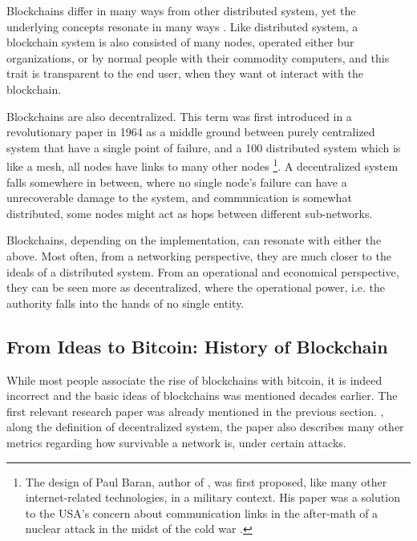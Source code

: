 Blockchains differ in many ways from other distributed system, yet the underlying concepts resonate
in many ways \cite{Herlihy_2019}. Like distributed system, a blockchain system is also consisted of
many nodes, operated either bur organizations, or by normal people with their commodity computers,
and this trait is transparent to the end user, when they want ot interact with the blockchain.

Blockchains are also decentralized. This term was first introduced in a revolutionary paper in 1964
as a middle ground between purely centralized system that have a single point of failure, and a 100%
distributed system which is like a mesh, all nodes have links to many other nodes
\cite{on_distributed_comm_networks_1964} \footnote{The design of Paul Baran, author of
\cite{on_distributed_comm_networks_1964}, was first proposed, like many other internet-related
technologies, in a military context. His paper was a solution to the USA's concern about
communication links in the after-math of a nuclear attack in the midst of the cold war
\cite{paul_baran_cold_war}.}. A decentralized system falls somewhere in between, where no single
node's failure can have a unrecoverable damage to the system, and communication is somewhat
distributed, some nodes might act as hops between different sub-networks.

Blockchains, depending on the implementation, can resonate with either the above. Most often, from a
networking perspective, they are much closer to the ideals of a distributed system. From an
operational and economical perspective, they can be seen more as decentralized, where the
operational power, i.e. the authority falls into the hands of no single entity.


\subsection{From Ideas to Bitcoin: History of Blockchain} \label{chap_bg_:subsec:hisotry}

While most people associate the rise of blockchains with bitcoin, it is indeed incorrect and the
basic ideas of blockchains was mentioned decades earlier. The first relevant research paper was
already mentioned in the previous section. \cite{on_distributed_comm_networks_1964}, along the
definition of decentralized system, the paper also describes many other metrics regarding how
survivable a network is, under certain attacks.

